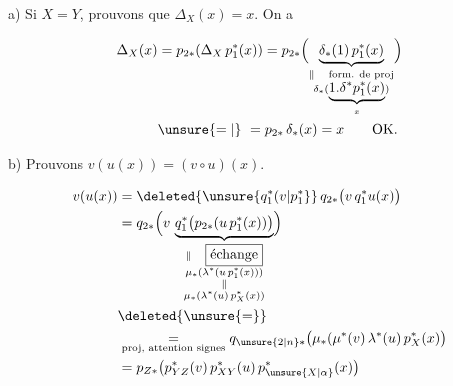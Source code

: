 a) Si $X=Y$, prouvons que $\Delta_X(x)=x$. On a

\[
\begin{aligned}
\Delta_X(x)&=p_{2*}(\Delta_X\,p_1^*(x))
=p_{2*}\Bigl(\underbrace{\delta_*(1)\,p_1^*(x)}_{\substack{\Vert\quad\text{form. de proj}\\\delta_*(\underbrace{1.\delta^*p_1^*(x)}_{x})}}\Bigr)\\
&\unsure{=|{}}\ =p_{2*}\,\delta_*(x)=x\qquad\text{OK.}
\end{aligned}
\]


b) Prouvons $v(u(x))=(v\circ u)(x)$.



\[
\begin{aligned}
v(u(x))&=\deleted{\unsure{q_1^*(v|p_1^*}}\,q_{2*}\bigl(v\,q_1^*u(x)\bigr)\\
&=q_{2*}\Bigl(v\,\underbrace{q_1^*\bigl(p_{2*}(u\,p_1^*(x))\bigr)}_{\substack{\Vert\quad\boxed{\text{échange}}\\\mu_*(\lambda^*(u\,p_1^*(x)))\\\Vert\\\mu_*(\lambda^*(u)\,p_X^*(x))}}\Bigr)\\
&\deleted{\unsure{=}}\\
&\underset{\text{proj, attention signes}}{=}q_{\unsure{2|n}*}\bigl(\mu_*(\mu^*(v)\,\lambda^*(u)\,p_X^*(x)\bigr)\\
&=p_{Z*}\bigl(p_{YZ}^*(v)\,p_{XY}^*(u)\,p_{\unsure{X|\alpha}}^*(x)\bigr)
\end{aligned}
\]

